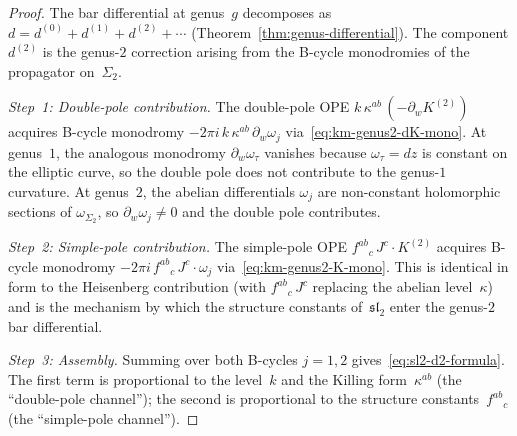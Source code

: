\begin{proof}
The bar differential at genus~$g$ decomposes as
$d = d^{(0)} + d^{(1)} + d^{(2)} + \cdots$
(Theorem~\ref{thm:genus-differential}).  The component $d^{(2)}$ is
the genus-$2$ correction arising from the B-cycle monodromies of the
propagator on~$\Sigma_2$.

\emph{Step~1: Double-pole contribution.}
The double-pole OPE $k\,\kappa^{ab}\, (-\partial_w K^{(2)})$ acquires
B-cycle monodromy $-2\pi i\, k\,\kappa^{ab}\, \partial_w\omega_j$
via~\eqref{eq:km-genus2-dK-mono}.  At genus~$1$, the analogous
monodromy $\partial_w\omega_\tau$ vanishes because $\omega_\tau = dz$
is constant on the elliptic curve, so the double pole does not
contribute to the genus-$1$ curvature.  At genus~$2$, the abelian
differentials $\omega_j$ are non-constant holomorphic sections of
$\omega_{\Sigma_2}$, so $\partial_w\omega_j \neq 0$ and the double
pole contributes.

\emph{Step~2: Simple-pole contribution.}
The simple-pole OPE $f^{ab}{}_c\, J^c \cdot K^{(2)}$ acquires
B-cycle monodromy $-2\pi i\, f^{ab}{}_c\, J^c \cdot \omega_j$
via~\eqref{eq:km-genus2-K-mono}.  This is identical in form to the
Heisenberg contribution (with $f^{ab}{}_c\, J^c$ replacing the abelian
level~$\kappa$) and is the mechanism by which the structure constants
of~$\mathfrak{sl}_2$ enter the genus-$2$ bar differential.

\emph{Step~3: Assembly.}
Summing over both B-cycles $j = 1, 2$
gives~\eqref{eq:sl2-d2-formula}.  The first term is proportional to the
level~$k$ and the Killing form~$\kappa^{ab}$ (the ``double-pole
channel''); the second is proportional to the structure
constants~$f^{ab}{}_c$ (the ``simple-pole channel'').
\end{proof}

